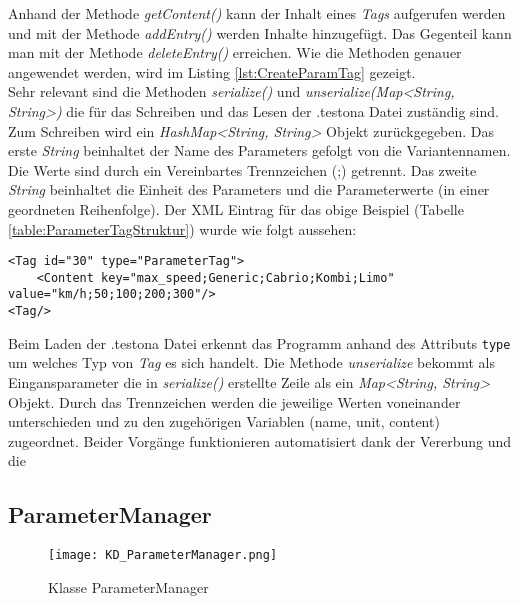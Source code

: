Anhand der Methode \textit{getContent()} kann der Inhalt eines \textit{Tags} aufgerufen werden und mit der Methode \textit{addEntry()} werden Inhalte hinzugefügt. Das Gegenteil kann man mit der Methode \textit{deleteEntry()} erreichen. Wie die Methoden genauer angewendet werden, wird im Listing \ref{lst:CreateParamTag} gezeigt.\\


Sehr relevant sind die Methoden \textit{serialize()} und \textit{unserialize(Map<String, String>)} die für das Schreiben und das Lesen der .testona Datei zuständig sind. Zum Schreiben wird ein \textit{HashMap<String, String>} Objekt zurückgegeben. Das erste \textit{String} beinhaltet der Name des Parameters gefolgt von die Variantennamen. Die Werte sind durch ein Vereinbartes Trennzeichen (;)  getrennt. Das zweite \textit{String} beinhaltet die Einheit des Parameters und die Parameterwerte (in einer geordneten Reihenfolge). Der XML Eintrag für das obige Beispiel (Tabelle \ref{table:ParameterTagStruktur}) wurde wie folgt aussehen:\\

\begin{lstlisting}[caption={XML Darstellung eines ParameterTags}, captionpos=b]
<Tag id="30" type="ParameterTag">
	<Content key="max_speed;Generic;Cabrio;Kombi;Limo" value="km/h;50;100;200;300"/>
<Tag/>
\end{lstlisting}


Beim Laden der .testona Datei erkennt das Programm anhand des Attributs \texttt{type} um welches Typ von \textit{Tag} es sich handelt. Die Methode \textit{unserialize} bekommt als Eingansparameter die in \textit{serialize()} erstellte Zeile als ein \textit{Map<String, String>} Objekt. Durch das Trennzeichen werden die jeweilige Werten voneinander unterschieden und zu den zugehörigen Variablen (name, unit, content) zugeordnet. Beider Vorgänge funktionieren automatisiert dank der Vererbung und die

\subsection{ParameterManager}\label{sub:ParameterManager}

\begin{figure}[h!]
  \begin{center}
    \texttt{[image: KD\_ParameterManager.png]}
  		  \caption{Klasse ParameterManager}
     \label{kd.ParameterMananger}
  \end{center}
\end{figure}

